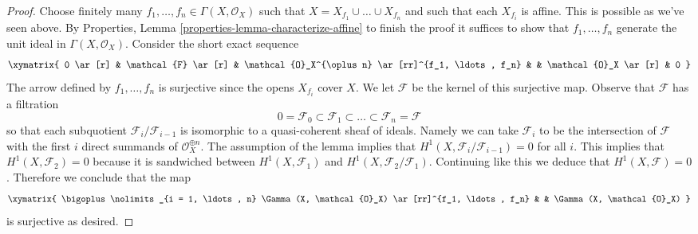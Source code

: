 \begin{proof}
\medskip\noindent
Choose finitely many $f_1, \ldots, f_n \in \Gamma(X, \mathcal{O}_X)$
such that $X = X_{f_1} \cup \ldots \cup X_{f_n}$ and such that each
$X_{f_i}$ is affine. This is possible as we've seen above.
By Properties, Lemma \ref{properties-lemma-characterize-affine}
to finish the proof it suffices
to show that $f_1, \ldots, f_n$ generate the unit ideal in
$\Gamma(X, \mathcal{O}_X)$. Consider the short exact sequence
$$
\xymatrix{
0 \ar[r] &
\mathcal{F} \ar[r] &
\mathcal{O}_X^{\oplus n} \ar[rr]^{f_1, \ldots, f_n} & &
\mathcal{O}_X \ar[r] &
0
}
$$
The arrow defined by $f_1, \ldots, f_n$ is surjective since the
opens $X_{f_i}$ cover $X$. We let $\mathcal{F}$ be the kernel
of this surjective map.
Observe that $\mathcal{F}$ has a filtration
$$
0 = \mathcal{F}_0 \subset \mathcal{F}_1 \subset
\ldots \subset \mathcal{F}_n = \mathcal{F}
$$
so that each subquotient $\mathcal{F}_i/\mathcal{F}_{i - 1}$ is
isomorphic to a quasi-coherent sheaf of ideals.
Namely we can take $\mathcal{F}_i$ to be the intersection of
$\mathcal{F}$ with the first $i$ direct summands of
$\mathcal{O}_X^{\oplus n}$.
The assumption
of the lemma implies that $H^1(X, \mathcal{F}_i/\mathcal{F}_{i - 1}) = 0$
for all $i$. This implies that
$H^1(X, \mathcal{F}_2) = 0$ because it is sandwiched between
$H^1(X, \mathcal{F}_1)$ and $H^1(X, \mathcal{F}_2/\mathcal{F}_1)$.
Continuing like this we deduce that $H^1(X, \mathcal{F}) = 0$.
Therefore we conclude that the map
$$
\xymatrix{
\bigoplus\nolimits_{i = 1, \ldots, n} \Gamma(X, \mathcal{O}_X)
\ar[rr]^{f_1, \ldots, f_n} & &
\Gamma(X, \mathcal{O}_X)
}
$$
is surjective as desired.
\end{proof}
